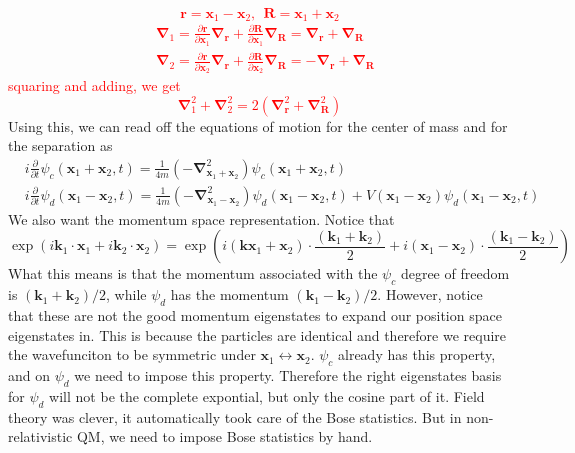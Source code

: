 \documentclass[11pt, notitlepage]{report}
\newcommand{\del}{\partial}
\numberwithin{equation}{section}
\begin{document}
    \textcolor{red}{
        \begin{equation*}
            \textbf{r} = \textbf{x}_1 - \textbf{x}_2,~~\textbf{R} = \textbf{x}_1 + \textbf{x}_2
        \end{equation*}
        \begin{align*}
            &\mathbf\nabla_1 = \frac{\del \textbf{r}}{\del \textbf{x}_1}\mathbf\nabla_\textbf{r} +  \frac{\del \textbf{R}}{\del \textbf{x}_1}\mathbf\nabla_\textbf{R} = \mathbf{\nabla}_\textbf{r} + \mathbf{\nabla}_\textbf{R}\\
            &\mathbf\nabla_2 = \frac{\del \textbf{r}}{\del \textbf{x}_2}\mathbf\nabla_\textbf{r} +  \frac{\del \textbf{R}}{\del \textbf{x}_2}\mathbf\nabla_\textbf{R} = -\mathbf{\nabla}_\textbf{r} + \mathbf{\nabla}_\textbf{R}
        \end{align*}
        squaring and adding, we get 
        \begin{equation*}
            \mathbf\nabla_1^2 + \mathbf\nabla_2^2 = 2(\mathbf{\nabla}_\textbf{r}^2 + \mathbf{\nabla}_\textbf{R}^2)
        \end{equation*}
    }
    Using this, we can read off the equations of motion for the center of mass and for the separation as 
    \begin{align*}
        &i\frac{\del}{\del t}\psi_c(\textbf{x}_1+ \textbf{x}_2,t) = \frac{1}{4m}\left( -\mathbf\nabla_{\textbf{x}_1 + \textbf{x}_2}^2 \right) \psi_c(\textbf{x}_1 + \textbf{x}_2,t)\\
        &i\frac{\del}{\del t}\psi_d(\textbf{x}_1- \textbf{x}_2,t) = \frac{1}{4m}\left( -\mathbf\nabla_{\textbf{x}_1 - \textbf{x}_2}^2 \right) \psi_d(\textbf{x}_1 - \textbf{x}_2,t) + V(\textbf{x}_1 - \textbf{x}_2)\psi_d(\textbf{x}_1 - \textbf{x}_2,t)
    \end{align*}
    We also want the momentum space representation. Notice that 
    \begin{equation*}
        \exp(i\textbf{k}_1 \cdot \textbf{x}_1 + i\textbf{k}_2 \cdot \textbf{x}_2) = \exp\left( i(\textbf{kx}_1 + \textbf{x}_2)\cdot \frac{(\textbf{k}_1 + \textbf{k}_2)}{2} + i(\textbf{x}_1 - \textbf{x}_2)\cdot \frac{(\textbf{k}_1 - \textbf{k}_2)}{2}     \right)
    \end{equation*}
    What this means is that the momentum associated with the \(\psi_c\) degree of freedom is \((\textbf{k}_1 + \textbf{k}_2)/2\), while \(\psi_d\) has the momentum \((\textbf{k}_1 - \textbf{k}_2)/2\). However, notice that these are not the good momentum eigenstates to expand our position space eigenstates in. This is because the particles are identical and therefore we require the wavefunciton to be symmetric under \(\textbf{x}_1 \leftrightarrow \textbf{x}_2\). \(\psi_c\) already has this property, and on \(\psi_d\) we need to impose this property. Therefore the right eigenstates basis for \(\psi_d\) will not be the complete expontial, but only the cosine part of it. Field theory was clever, it automatically took care of the Bose statistics. But in non-relativistic QM, we need to impose Bose statistics by hand. \\
\end{document}
